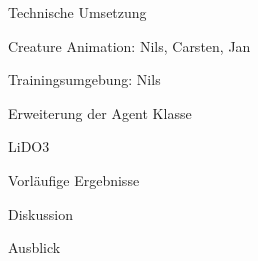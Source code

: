 \begin{thallok}
\begin{thallok}
\begin{thallok}
		\end{thallok}
	\end{thallok}
	\item Technische Umsetzung
	\begin{thallok}
		\item Creature Animation: Nils, Carsten, Jan
		\begin{thallok}
			\item Trainingsumgebung: Nils
			\item Erweiterung der Agent Klasse
			\item LiDO3
		\end{thallok}
	\end{thallok}
	\item Vorläufige Ergebnisse
	\begin{thallok}
		\item Diskussion
	\end{thallok}
	\item Ausblick
\end{thallok}

